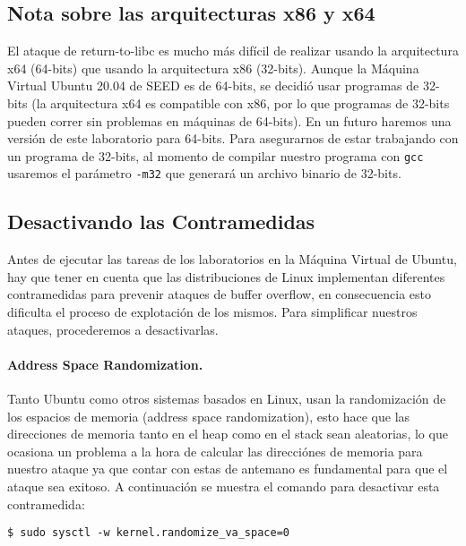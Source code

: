 \subsection{Nota sobre las arquitecturas x86 y x64}

El ataque de return-to-libc es mucho más difícil de realizar usando la arquitectura x64 (64-bits) que usando la arquitectura x86 (32-bits).
Aunque la Máquina Virtual Ubuntu 20.04 de SEED es de 64-bits, se decidió usar programas de 32-bits (la arquitectura x64 es compatible con x86, por lo que programas de 32-bits pueden correr sin problemas en máquinas de 64-bits). En un futuro haremos una versión de este laboratorio para 64-bits.
Para asegurarnos de estar trabajando con un programa de 32-bits, al momento de compilar nuestro programa con \texttt{gcc} usaremos el parámetro \texttt{-m32} que generará un archivo binario de 32-bits.



\subsection{Desactivando las Contramedidas}

Antes de ejecutar las tareas de los laboratorios en la Máquina Virtual de Ubuntu, hay que tener en cuenta que las distribuciones de Linux implementan diferentes contramedidas para prevenir ataques de buffer overflow, en consecuencia esto dificulta el proceso de explotación de los mismos.
Para simplificar nuestros ataques, procederemos a desactivarlas.


\paragraph{Address Space Randomization.}
Tanto Ubuntu como otros sistemas basados en Linux, usan la randomización de los espacios de memoria (address space randomization), esto hace que las direcciones de memoria tanto en el heap como en el stack sean aleatorias, lo que ocasiona un problema a la hora de calcular las direcciónes de memoria para nuestro ataque ya que contar con estas de antemano es fundamental para que el ataque sea exitoso. 
A continuación se muestra el comando para desactivar esta contramedida:

\begin{lstlisting}
$ sudo sysctl -w kernel.randomize_va_space=0
\end{lstlisting}


